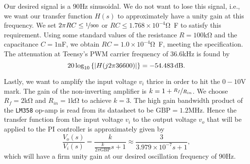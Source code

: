 Our desired signal is a $90$\unit{\hertz} sinusoidal. We do not want to lose
this signal, i.e., we want our transfer function $H(s)$ to approximately have a
unity gain at this frequency. We set $2\pi RC \leq \nicefrac{1}{900}$ or $RC
\leq 1.768 \times 10^{-4}$\unit{\ohm\farad} to satisfy this requirement. Using
some standard values of the resistance $R = 100$\unit{\kilo\ohm} and the
capacitance $C = 1$\unit{\nano\farad}, we obtain $RC = 1.0 \times
10^{-4}$\unit{\ohm\farad}, meeting the specification. The attenuation at
Teensy's PWM carrier frequency of $36.6$\unit{\kilo\hertz} is found by \[ 20
\log_{10}\left\{\abs{H(j 2\pi 36600)}\right\} = -54.483\,\unit{\decibel}. \]

Lastly, we want to amplify the input voltage $v_i$ thrice in order to hit the
$0-10$\unit{\volt} mark. The gain of the non-inverting amplifier is $k = 1 +
\nicefrac{R_f}{R_{in}}$. We choose $R_f = 2$\unit{\kilo\ohm} and $R_{in} =
1$\unit{\kilo\ohm} to achieve $k = 3$. The high gain bandwidth product of the
\texttt{LM358} op-amp is read from its datasheet to be $\text{GBP} =
1.2$\unit{\mega\hertz}. Hence the transfer function from the input voltage $v_i$
to the output voltage $v_o$ that will be applied to the PI controller is
approximately given by \[ \frac{V_o(s)}{V_i(s)} =
\frac{k}{\frac{k}{2\pi\text{GBP}}s + 1} \approx \frac{3}{3.979\times 10^{-7}s +
1}, \] which will have a firm unity gain at our desired oscillation frequency of
$90$\unit{\hertz}.


